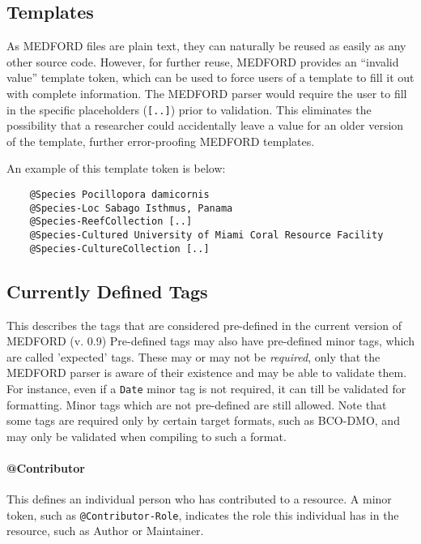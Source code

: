 \documentclass[10pt]{article}
\newcommand{\version}{0.9}
\begin{document}
\subsection{Templates} \label{templates}

As MEDFORD files are plain text, they can naturally be reused as easily as any other source code.
However, for further reuse, MEDFORD provides an ``invalid value'' template token, which can be used to force users of a template to fill it out with complete information. The MEDFORD parser would require the user to fill in the specific placeholders (\texttt{[..]}) prior to validation. This eliminates the possibility that a researcher could accidentally leave a value for an older version of the template, further error-proofing MEDFORD templates.

An example of this template token is below:

\begin{verbatim}
    @Species Pocillopora damicornis
    @Species-Loc Sabago Isthmus, Panama
    @Species-ReefCollection [..]
    @Species-Cultured University of Miami Coral Resource Facility
    @Species-CultureCollection [..]
\end{verbatim}

    
\subsection{Currently Defined Tags}
\label{tags}
    
    This describes the tags that are considered pre-defined in the current version of MEDFORD (v. \version)
    Pre-defined tags may also have pre-defined minor tags, which are called 'expected' tags. These may or may not be \textit{required}, only that the MEDFORD parser is aware of their existence and may be able to validate them. For instance, even if a \texttt{Date} minor tag is not required, it can till be validated for formatting. Minor tags which are not pre-defined are still allowed.
    Note that some tags are required only by certain target formats, such as BCO-DMO, and may only be validated when compiling to such a format.
    
    \paragraph{@Contributor}
    
    This defines an individual person who has contributed to a resource. A minor token, such as \texttt{@Contributor-Role}, indicates the role this individual has in the resource, such as Author or Maintainer.
    
\end{document}
